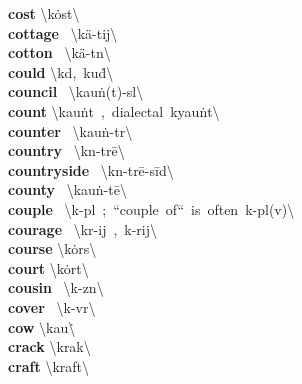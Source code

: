 \documentclass[10pt,a4paper]{article}
\begin{document}
\begin{multicols}{2}
\textbf{ cost }\quad \textbackslash \textprimstress k\.{o}st\textbackslash \\
\textbf{ cottage }\quad \ \textbackslash \textprimstress k\"{a}-tij\textbackslash \\
\textbf{ cotton }\quad \ \textbackslash \textprimstress k\"{a}-t\textsuperscript{\textreve}n\textbackslash \\
\textbf{ could }\quad \textbackslash k\textschwa d,\ \textprimstress ku\. d\textbackslash \\
\textbf{ council }\quad \ \textbackslash \textprimstress kau\. n(t)-s\textschwa l\textbackslash \\
\textbf{ count }\quad \textbackslash \textprimstress kau\. nt\ ,\ dialectal\ \textprimstress kyau\. nt\textbackslash \\
\textbf{ counter }\quad \ \textbackslash \textprimstress kau\. n-t\textschwa r\textbackslash \\
\textbf{ country }\quad \ \textbackslash \textprimstress k\textschwa n-tr\={e}\textbackslash \\
\textbf{ countryside }\quad \ \textbackslash \textprimstress k\textschwa n-tr\={e}-\textsecstress s\={i}d\textbackslash \\
\textbf{ county }\quad \ \textbackslash \textprimstress kau\. n-t\={e}\textbackslash \\
\textbf{ couple }\quad \ \textbackslash \textprimstress k\textschwa -p\textschwa l\ ;\ ``couple\ of``\ is\ often\ \textsecstress k\textschwa -pl\textschwa (v)\textbackslash \\
\textbf{ courage }\quad \ \textbackslash \textprimstress k\textschwa r-ij\ ,\ \textprimstress k\textschwa -rij\textbackslash \\
\textbf{ course }\quad \textbackslash \textprimstress k\.{o}rs\textbackslash \\
\textbf{ court }\quad \textbackslash \textprimstress k\.{o}rt\textbackslash \\
\textbf{ cousin }\quad \ \textbackslash \textprimstress k\textschwa -z\textschwa n\textbackslash \\
\textbf{ cover }\quad \ \textbackslash \textprimstress k\textschwa -v\textschwa r\textbackslash \\
\textbf{ cow }\quad \textbackslash \textprimstress kau\. \textbackslash \\
\textbf{ crack }\quad \textbackslash \textprimstress krak\textbackslash \\
\textbf{ craft }\quad \textbackslash \textprimstress kraft\textbackslash \\

\end{multicols}
\end{document}
